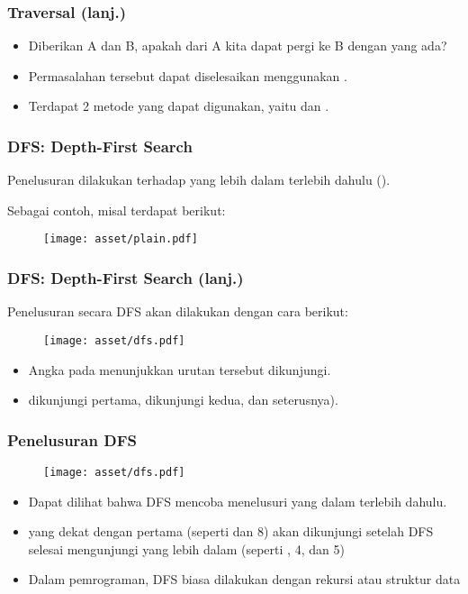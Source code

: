 \begin{frame}
\frametitle{\fGraph Traversal (lanj.)}
\begin{itemize}
  \item Diberikan \fnode A dan \fnode B, apakah dari \fnode A kita dapat pergi ke \fnode B dengan \fedge yang ada?
  \item Permasalahan tersebut dapat diselesaikan menggunakan \fgraphtraversal.
  \newline
  \item Terdapat 2 metode yang dapat digunakan, yaitu  dan .
\end{itemize}
\end{frame}

\begin{frame}
\frametitle{DFS: Depth-First Search}
Penelusuran dilakukan terhadap \fnode yang lebih dalam terlebih dahulu (). 

Sebagai contoh, misal terdapat \fgraph berikut:

\begin{figure}
  \centering
  \texttt{[image: asset/plain.pdf]}
\end{figure}
\end{frame}

\begin{frame}
\frametitle{DFS: Depth-First Search (lanj.)}
Penelusuran secara DFS akan dilakukan dengan cara berikut:
\begin{figure}
  \centering
  \texttt{[image: asset/dfs.pdf]}
\end{figure}
\begin{itemize}
  \item Angka pada \fnode menunjukkan urutan \fnode tersebut dikunjungi.
  \item {} dikunjungi pertama,  dikunjungi kedua, dan seterusnya).
\end{itemize}
\end{frame}

\begin{frame}
\frametitle{Penelusuran DFS}
\begin{figure}
  \centering
  \texttt{[image: asset/dfs.pdf]}
\end{figure}
\begin{itemize}
  \item Dapat dilihat bahwa DFS mencoba menelusuri \fnode yang dalam terlebih dahulu.
  \item \fNode yang dekat dengan \fnode pertama (seperti  dan 8) akan dikunjungi setelah DFS selesai mengunjungi \fnode yang lebih dalam (seperti , 4, dan 5)
  \item Dalam pemrograman, DFS biasa dilakukan dengan rekursi atau struktur data 
\end{itemize}
\end{frame}



